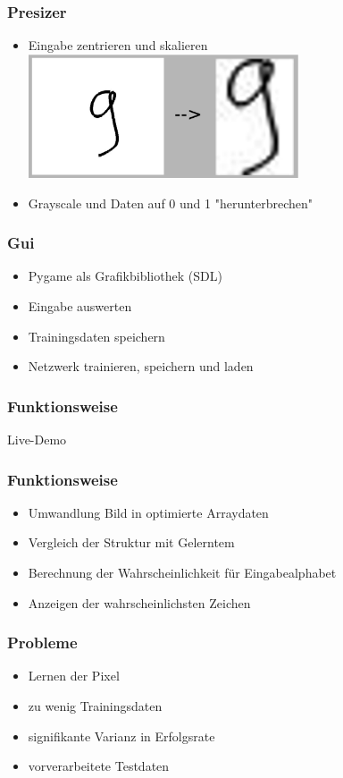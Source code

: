 \documentclass[14pt]{beamer}
\theoremstyle{remark}
\begin{document}
\begin{frame}
	\frametitle{Presizer}
	\begin{itemize}
		\item Eingabe zentrieren und skalieren \\
		\includegraphics[width=8cm]{src/presize.eps}
		\item Grayscale und Daten auf 0 und 1 "herunterbrechen"
	\end{itemize}
\end{frame}

\begin{frame}
	\frametitle{Gui}
	\begin{itemize}
		\item Pygame als Grafikbibliothek (SDL)
		\item Eingabe auswerten
		\item Trainingsdaten speichern
		\item Netzwerk trainieren, speichern und laden
	\end{itemize}
\end{frame}

\begin{frame}
	\frametitle{Funktionsweise}
	\centering
	Live-Demo
\end{frame}

\begin{frame}
	\frametitle{Funktionsweise}
	\begin{itemize}
		\item Umwandlung Bild in optimierte Arraydaten
		\item Vergleich der Struktur mit Gelerntem
		\item Berechnung der Wahrscheinlichkeit für Eingabealphabet
		\item Anzeigen der wahrscheinlichsten Zeichen
	\end{itemize}
\end{frame}

\begin{frame}
	\frametitle{Probleme}
	\begin{itemize}
		\item Lernen der Pixel
		\item zu wenig Trainingsdaten
		\item signifikante Varianz in Erfolgsrate
		\item vorverarbeitete Testdaten
	\end{itemize}
\end{frame}
\end{document}
